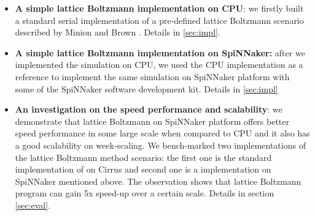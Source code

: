 \begin{itemize}
\item \textbf{A simple lattice Boltzmann implementation on CPU}: we firstly built a standard serial implementation of a pre-defined lattice Boltzmann scenario described by Minion and Brown \cite{minion1997performance}. Details in \ref{sec:impl}. \\

\item \textbf{A simple lattice Boltzmann implementation on SpiNNaker:} after we implemented the simulation on CPU, we used the CPU implementation as a reference to implement the same simulation on SpiNNaker platform with some of the SpiNNaker software development kit. Details in \ref{sec:impl}\\

\item \textbf{An investigation on the speed performance and scalability}: we demonstrate that lattice Boltzmann on SpiNNaker platform offers better speed performance in some large scale when compared to CPU and it also has a good scalability on week-scaling. We bench-marked two implementations of the lattice Boltzmann method scenario: the first one is the standard implementation of on Cirrus and second one is a implementation on SpiNNaker mentioned above. The observation shows that lattice Boltzmann program can gain 5x speed-up over a certain scale. Details in section \ref{sec:eval}.
\end{itemize}


